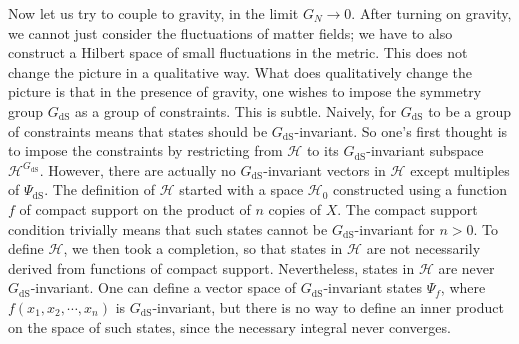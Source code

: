 \documentclass[11pt,a4paper]{article}
\def\H{{\mathcal H}}
\def\dS{{\mathrm{dS}}}
\begin{document}
Now let us try to couple to gravity, in the limit $G_N\to 0$.     After turning on gravity, we cannot just consider the fluctuations of matter fields;
we have to also construct a Hilbert space of small fluctuations in the metric. This does not change the picture in a qualitative way.
What does qualitatively change the picture is that in the presence of gravity, one wishes to impose the symmetry group $G_\dS$ as a group of constraints.
This is subtle.   Naively, for $G_\dS$ to be a group of constraints means that states should be $G_\dS$-invariant.  So one's first thought is to impose the constraints
by restricting from $\H$ to its $G_\dS$-invariant subspace $\H^{G_\dS}$.    However, 
there are actually no $G_\dS$-invariant vectors in $\H$ except  multiples of $\Psi_\dS$.  
The definition of $\H$ started with a space $\H_0$ constructed using a function $f$ of compact support on the product of $n$ copies of $X$.   The compact support condition trivially
means that such states cannot be $G_\dS$-invariant for $n>0$.   To define $\H$, we then took a completion, so that states in $\H$ are not necessarily derived
from functions of compact support.   Nevertheless, states in $\H$ are never $G_\dS$-invariant.  One can define a vector space of $G_\dS$-invariant
states $\Psi_f$, where $f(x_1,x_2,\cdots, x_n)$ is $G_\dS$-invariant, but there is no way to define an inner product on the space of such states, since
the necessary integral never converges.  
\end{document}
